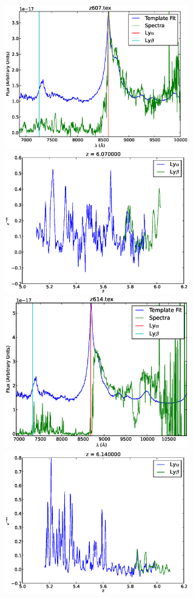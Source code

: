 \documentclass[11pt]{article}
\begin{document}
\begin{figure}[h]
  \centering
  \includegraphics[width=8cm]{z607.eps}
  \includegraphics[width=8cm]{z607_Transmission.eps}
  \includegraphics[width=8cm]{z614.eps}
  \includegraphics[width=8cm]{z614_Transmission.eps}

\end{figure}
\end{document}
